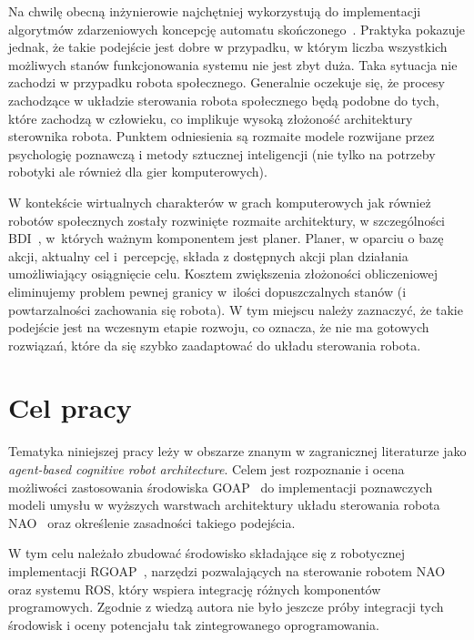 {Na chwilę obecną inżynierowie najchętniej wykorzystują do implementacji algorytmów zdarzeniowych koncepcję automatu skończonego~\cite{FOUK}. Praktyka pokazuje jednak, że takie podejście jest dobre w przypadku, w którym liczba wszystkich możliwych stanów funkcjonowania systemu nie jest zbyt duża. Taka sytuacja nie zachodzi w przypadku robota społecznego. Generalnie oczekuje się, że procesy zachodzące w układzie sterowania robota społecznego będą podobne do tych, które zachodzą w człowieku, co implikuje wysoką złożoność architektury sterownika robota. Punktem odniesienia są rozmaite modele rozwijane przez psychologię poznawczą i metody sztucznej inteligencji (nie tylko na potrzeby robotyki ale również dla gier komputerowych).

W kontekście wirtualnych charakterów w grach komputerowych jak również robotów społecznych zostały rozwinięte rozmaite architektury, w szczególności BDI~\cite{NORL}, w~których ważnym komponentem jest planer. Planer, w oparciu o bazę akcji, aktualny cel i~percepcję, składa z dostępnych akcji plan działania umożliwiający osiągnięcie celu. Kosztem zwiększenia złożoności obliczeniowej eliminujemy problem pewnej granicy w~ilości dopuszczalnych stanów (i powtarzalności zachowania się robota). W tym miejscu należy zaznaczyć, że takie podejście jest na wczesnym etapie rozwoju, co oznacza, że nie ma gotowych rozwiązań, które da się szybko zaadaptować do układu sterowania robota.

\section{Cel pracy}
\label{sec:cel}
Tematyka niniejszej pracy leży w obszarze znanym w zagranicznej literaturze jako \textit{agent-based cognitive robot architecture}. Celem jest rozpoznanie i ocena możliwości zastosowania środowiska GOAP~\cite{ORKIfear} do implementacji poznawczych modeli umysłu w wyższych warstwach architektury układu sterowania robota NAO~\cite{NAOsite} oraz określenie zasadności takiego podejścia. 

W tym celu należało zbudować środowisko składające się z robotycznej implementacji RGOAP~\cite{KOLB}, narzędzi pozwalających na sterowanie robotem NAO oraz systemu ROS, który wspiera integrację różnych komponentów programowych. Zgodnie z wiedzą autora nie było jeszcze próby integracji tych środowisk i oceny potencjału tak zintegrowanego oprogramowania.




}
